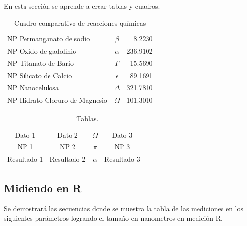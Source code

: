 \documentclass{article}
\begin{document}
En esta secci\'{o}n se aprende a crear tablas y cuadros.

\begin{table}[h!] %
    \caption{Cuadro comparativo de reacciones químicas} %
    \label{datos} %
    \centering %
    \begin{tabular}{l|cr} %
         NP Permanganato de sodio & $\beta$ & 8.2230 \\
         NP Oxido de gadolinio  & $\alpha$ & 236.9102 \\
         NP Titanato de Bario & $\Gamma$ & 15.5690 \\
         NP Silicato de Calcio & $\epsilon$ & 89.1691 \\
         NP Nanocelulosa & $\Delta$ & 321.7810 \\
         NP Hidrato Cloruro de Magnesio & $\Omega$ & 101.3010 
    \end{tabular}
\end{table}

\begin{table}[h!]

    \caption{Tablas.}
    \label{otros_datos}
    \centering
    \begin{tabular}{c|c|c|c|c|c||c|c|}
      Dato 1 & Dato 2 & $\Omega$ & Dato 3 \\
      NP 1 & NP 2 & $\pi$ & NP 3 \\
      Resultado 1  &   Resultado 2   &   $\alpha$ &  Resultado 3 
    
    \end{tabular}
\end{table}

\subsection{Midiendo en R}

Se demostrará las secuencias donde se muestra la tabla de las mediciones en los siguientes parámetros logrando el tamaño en nanometros en medición R.
\end{document}

